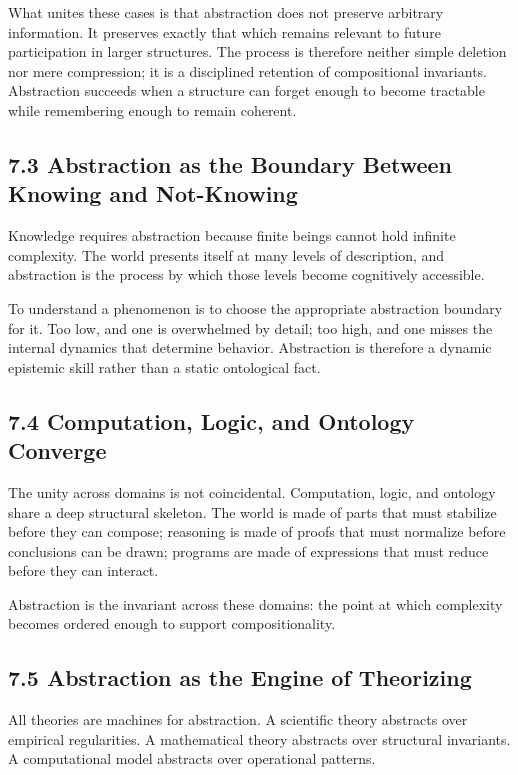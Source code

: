 \documentclass[12pt,letterpaper]{article}
\theoremstyle{remark}
\begin{document}
What unites these cases is that abstraction does not preserve arbitrary information. It preserves exactly that which remains relevant to future participation in larger structures. The process is therefore neither simple deletion nor mere compression; it is a disciplined retention of compositional invariants. Abstraction succeeds when a structure can forget enough to become tractable while remembering enough to remain coherent.

\subsection{7.3 Abstraction as the Boundary Between Knowing and Not-Knowing}

Knowledge requires abstraction because finite beings cannot hold infinite complexity. The world presents itself at many levels of description, and abstraction is the process by which those levels become cognitively accessible.

To understand a phenomenon is to choose the appropriate abstraction boundary for it. Too low, and one is overwhelmed by detail; too high, and one misses the internal dynamics that determine behavior. Abstraction is therefore a dynamic epistemic skill rather than a static ontological fact.

\subsection{7.4 Computation, Logic, and Ontology Converge}

The unity across domains is not coincidental. Computation, logic, and ontology share a deep structural skeleton. The world is made of parts that must stabilize before they can compose; reasoning is made of proofs that must normalize before conclusions can be drawn; programs are made of expressions that must reduce before they can interact.

Abstraction is the invariant across these domains: the point at which complexity becomes ordered enough to support compositionality.

\subsection{7.5 Abstraction as the Engine of Theorizing}

All theories are machines for abstraction. A scientific theory abstracts over empirical regularities. A mathematical theory abstracts over structural invariants. A computational model abstracts over operational patterns.
\end{document}
